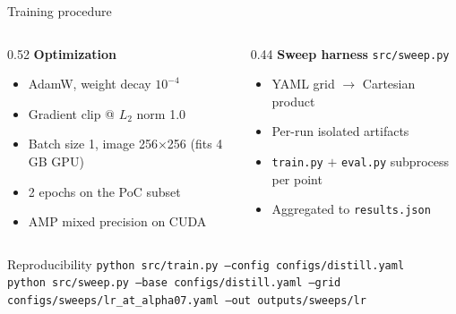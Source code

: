 \documentclass[aspectratio=169,10pt]{beamer}
\begin{document}
\begin{frame}{Training procedure}
\begin{columns}[T,onlytextwidth]
\begin{column}{0.52\textwidth}
\textbf{Optimization}
\begin{itemize}\setlength{\itemsep}{0.2em}
  \item AdamW, weight decay $10^{-4}$
  \item Gradient clip @ $L_2$ norm 1.0
  \item Batch size 1, image 256$\times$256 (fits 4\,GB GPU)
  \item 2 epochs on the PoC subset
  \item AMP mixed precision on CUDA
\end{itemize}
\end{column}
\begin{column}{0.44\textwidth}
\textbf{Sweep harness} \texttt{src/sweep.py}
\begin{itemize}\setlength{\itemsep}{0.2em}
  \item YAML grid $\rightarrow$ Cartesian product
  \item Per-run isolated artifacts
  \item \texttt{train.py} $+$ \texttt{eval.py} subprocess per point
  \item Aggregated to \texttt{results.json}
\end{itemize}
\end{column}
\end{columns}
\vspace{0.5em}
\begin{exampleblock}{Reproducibility}
\texttt{python src/train.py --config configs/distill.yaml}\\
\texttt{python src/sweep.py --base configs/distill.yaml --grid configs/sweeps/lr\_at\_alpha07.yaml --out outputs/sweeps/lr}
\end{exampleblock}
\end{frame}
\end{document}
